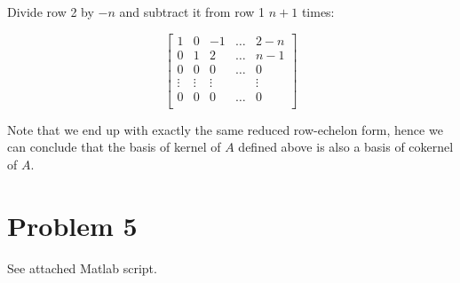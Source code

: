 \documentclass[10pt,letter]{article}
\begin{document}
Divide row 2 by $-n$ and subtract it from row 1 $n+1$ times:

\[
\left[ {\begin{array}{ccccc}
 1 & 0 & -1  & \ldots & 2 - n \\
 0 & 1 & 2 & \ldots & n - 1 \\
 0 & 0 & 0 &\ldots & 0 \\
 \vdots & \vdots & \vdots &  & \vdots \\
 0 & 0 & 0 & \ldots & 0 \\
\end{array} } \right]
\]

Note that we end up with exactly the same reduced row-echelon form, hence we can conclude that the basis of kernel of $A$ defined above is also a basis of cokernel of $A$.

\section{Problem 5}

See attached Matlab script.
\end{document}
